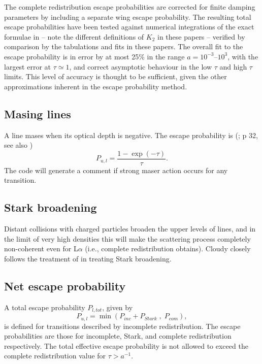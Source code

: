 The complete redistribution escape probabilities are corrected for
finite damping parameters by including a separate wing escape
probability.  The resulting total escape probabilities have been
tested against numerical integrations of the exact formulae in
\cite{Avrett1966,Hummer1982b} -- note the different definitions of
$K_2$ in these papers -- verified by comparison by the tabulations and
fits in these papers.  The overall fit to the escape probability is in
error by at most 25\% in the range $a=10^{-3}\mbox{--}10^3$, with the
largest error at $\tau\simeq 1$, and correct asymptotic behaviour in
the low $\tau$ and high $\tau$ limits.  This level of accuracy is
thought to be sufficient, given the other approximations inherent in
the escape probability method.

\subsection{Masing lines }

A line mases when its optical depth is negative.
The escape probability is (\citealp{Elitzur1992}; p 32, see also
\citealp{1990ApJ...363..628E,1990ApJ...363..638E})
\begin{equation}
{P_{u,l}} = \frac{{1 - \exp \left( { - \tau } \right)}}{\tau }.%
\end{equation}
The code will generate a comment if strong maser action occurs for any
transition.

\subsection{Stark broadening }

Distant collisions with charged particles broaden the upper levels of
lines, and in the limit of very high densities this will make the scattering
process completely non-coherent even for L$\alpha $ (i.e., complete redistribution
obtains).
Cloudy closely follows the treatment of \citet{Puetter1981} in treating
Stark broadening.

\subsection{Net escape probability }

A total escape probability $P_{l, tot}$, given by
\begin{equation}
{P_{u,l}} = \min \left( {{P_{inc}} + {P_{Stark}}\;,\;{P_{com}}} \right),%
\end{equation}
is defined for transitions described by incomplete redistribution.  The
escape probabilities are those for incomplete, Stark, and complete
redistribution respectively.  The total effective escape probability is
not allowed to exceed the complete redistribution value for
$\tau > a^{-1}$.

